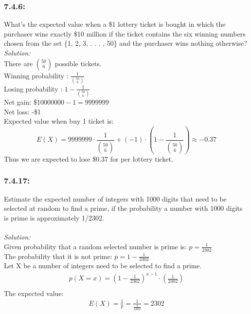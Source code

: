 \documentclass[a4paper]{article}
\begin{document}
	\subsubsection*{7.4.6:}
	What’s the expected value when a \$1 lottery
	ticket is bought in which the purchaser wins exactly
	\$10 million if the ticket contains the six winning
	numbers chosen from the set \{1, 2, 3, . . . , 50\} and
	the purchaser wins nothing otherwise?\\
	\textit{Solution:}\\
	There are ${50\choose6}$ possible tickets.\\
	Winning probability : $\frac{1}{{50\choose6}}$\\
	Losing probability : $ 1 - \frac{1}{{50\choose6}}$\\
	Net gain: \$$10000000-1=9999999$\\
	Net loss: -\$1\\
	Expected value when buy 1 ticket is:
	\begin{equation*}
	    E(X) = 9999999\cdot\frac{1}{{50\choose6}}+(-1)\cdot(1 - \frac{1}{{50\choose6}}) \approx -0.37
	\end{equation*}
	Thus we are expected to lose \$0.37 for per lottery ticket.
	\subsubsection*{7.4.17:}
	 Estimate the expected number of integers with 1000 digits that need to be selected at random to find a prime, if the probability a number with 1000 digits is prime is approximately 1/2302. \\ \\
	\textit{Solution:} \\
	Given probability that a random selected number is prime is: $p = \frac{1}{2302}$\\
	The probability that it is not prime: $\overline{p} = 1 - \frac{1}{2302}$ \\
	Let X be a number of integers need to be selected to find a prime. \\ 
	\begin{align*}
	p(X = x ) = (1 - \frac{1}{2302})^{x-1}\cdot(\frac{1}{2302}) \\ 
	\end{align*}
	The expected value: \\
	\begin{align*}
	E(X) = \frac{1}{p} = \frac{1}{\frac{1}{2302}} = 2302  
	\end{align*}
	
\end{document}
